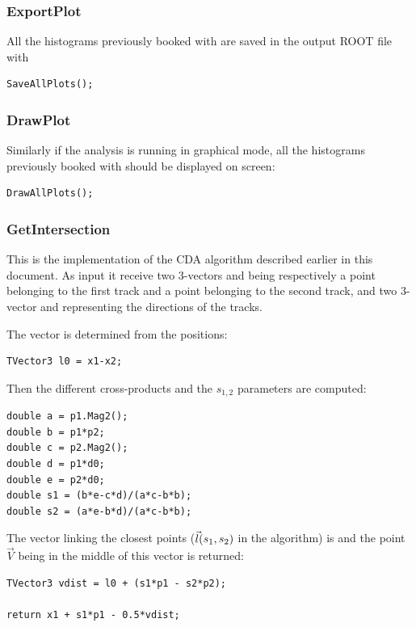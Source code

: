 \subsubsection{ExportPlot}
All the histograms previously booked with  are saved in the output ROOT file with

\begin{lstlisting}
SaveAllPlots();
\end{lstlisting} 

\subsubsection{DrawPlot}
Similarly if the analysis is running in graphical mode, all the histograms previously booked with
 should be displayed on screen:

\begin{lstlisting}
DrawAllPlots();
\end{lstlisting} 

\subsubsection{GetIntersection}\label{GetIntersection}
This is the implementation of the CDA algorithm described earlier in this document. As input it
receive two 3-vectors  and  being respectively a point belonging to the first track
and a point belonging to the second track, and two 3-vector  and  representing the
directions of the tracks.

The  vector is determined from the positions: 
\begin{lstlisting}
TVector3 l0 = x1-x2;
\end{lstlisting}
Then the different cross-products and the $s_{1,2}$ parameters are computed:
\begin{lstlisting}
double a = p1.Mag2();
double b = p1*p2;
double c = p2.Mag2();
double d = p1*d0;
double e = p2*d0;
double s1 = (b*e-c*d)/(a*c-b*b);
double s2 = (a*e-b*d)/(a*c-b*b);
\end{lstlisting}
The vector linking the closest points ($\vec{l}(s_1, s_2)$ in the algorithm) is  and the
point $\vec{V}$ being in the middle of this vector is returned:
\begin{lstlisting}
TVector3 vdist = l0 + (s1*p1 - s2*p2);

return x1 + s1*p1 - 0.5*vdist;
\end{lstlisting}

